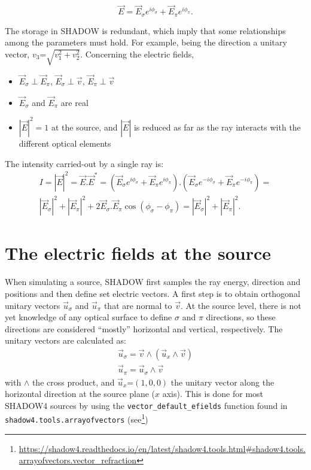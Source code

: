 \documentclass{iucr}
\begin{document}
\begin{equation}\label{eq:electricfieldray}
   \vec{E}= \vec{E}_\sigma e^{i \phi_\sigma} + \vec{E}_\pi e^{i \phi_\pi}.
\end{equation}

The storage in SHADOW is redundant, which imply that some relationships among the parameters must hold. For example, being the direction a unitary vector, $v_3\text{=}\sqrt{v_1^2+v_2^2}$. Concerning the electric fields,
\begin{itemize}
 \item $\vec{E}_\sigma \perp \vec{E}_\pi$, $\vec{E}_\sigma \perp \vec{v}$, $\vec{E}_\pi \perp \vec{v}$
 \item $\vec{E}_\sigma$ and $\vec{E}_\pi$ are real
 \item $|\vec{E}|^2=1$ at the source, and $|\vec{E}|$ is reduced as far as the ray interacts with the different 
 optical elements
\end{itemize}

The intensity carried-out by a single ray is:
\begin{eqnarray}
   I=|\vec{E}|^2 = \vec{E}.\vec{E}^* = (\vec{E}_\sigma e^{i \phi_\sigma} + \vec{E}_\pi e^{i\phi_\pi} ).
   (\vec{E}_\sigma e^{-i\phi_\sigma} + \vec{E}_\pi e^{-i\phi_\pi} ) =  \nonumber \\
   |\vec{E}_\sigma|^2 + |\vec{E}_\pi|^2 + 2 \vec{E}_\sigma.\vec{E}_\pi \cos(\phi_\sigma-\phi_\pi) =
   |\vec{E}_\sigma|^2 + |\vec{E}_\pi|^2.
\end{eqnarray}


\section{The electric fields at the source}
\label{sec:source}

When simulating a source, SHADOW first samples the ray energy, direction and positions and then define set electric vectors. 
A first step is to obtain orthogonal unitary vectors $\vec{u}_\sigma$ and $\vec{u}_\pi$ that are normal to $\vec{v}$.
At the source level, there is not yet knowledge of any optical surface to define $\sigma$ and $\pi$ directions, so these directions 
are considered ``mostly'' horizontal and vertical, respectively. The unitary vectors are calculated as: 
\begin{eqnarray}
   \vec{u}_\sigma = \vec{v} \wedge (\vec{u}_x \wedge \vec{v}) \nonumber \\
   \vec{u}_\pi = \vec{u}_\sigma \wedge  \vec{v}
\end{eqnarray}
with $\wedge$ the cross product, and  $\vec{u}_x\text{=}(1,0,0)$ the unitary vector along the horizontal direction at the source plane ($x$ axis).
This is done for most SHADOW4 sources by using the {\tt vector\_default\_efields} function found in {\tt shadow4.tools.arrayofvectors}
(see\footnote{\url{https://shadow4.readthedocs.io/en/latest/shadow4.tools.html#shadow4.tools.arrayofvectors.vector_refraction}})
\end{document}
